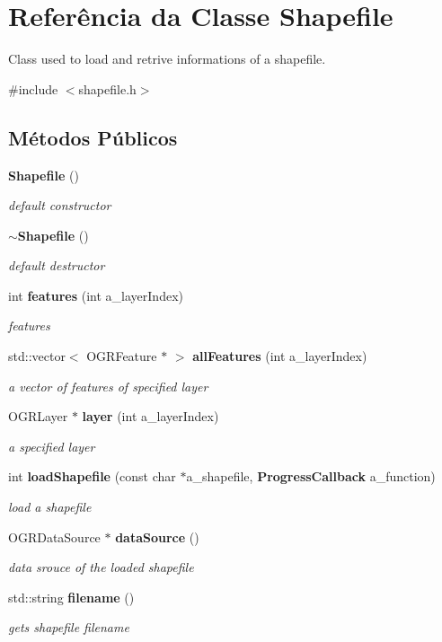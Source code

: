 \section{Referência da Classe Shapefile}
\label{class_shapefile}


Class used to load and retrive informations of a shapefile.  




{\ttfamily \#include $<$shapefile.\+h$>$}

\subsection*{Métodos Públicos}
\begin{DoxyCompactItemize}
\item 
{\bf Shapefile} ()
\begin{DoxyCompactList}\small\item\em default constructor \end{DoxyCompactList}\item 
{\bf $\sim$\+Shapefile} ()
\begin{DoxyCompactList}\small\item\em default destructor \end{DoxyCompactList}\item 
int {\bf features} (int a\+\_\+layer\+Index)
\begin{DoxyCompactList}\small\item\em features \end{DoxyCompactList}\item 
std\+::vector$<$ O\+G\+R\+Feature $\ast$ $>$ {\bf all\+Features} (int a\+\_\+layer\+Index)
\begin{DoxyCompactList}\small\item\em a vector of features of specified layer \end{DoxyCompactList}\item 
O\+G\+R\+Layer $\ast$ {\bf layer} (int a\+\_\+layer\+Index)
\begin{DoxyCompactList}\small\item\em a specified layer \end{DoxyCompactList}\item 
int {\bf load\+Shapefile} (const char $\ast$a\+\_\+shapefile, {\bf Progress\+Callback} a\+\_\+function)
\begin{DoxyCompactList}\small\item\em load a shapefile \end{DoxyCompactList}\item 
O\+G\+R\+Data\+Source $\ast$ {\bf data\+Source} ()
\begin{DoxyCompactList}\small\item\em data srouce of the loaded shapefile \end{DoxyCompactList}\item 
std\+::string {\bf filename} ()
\begin{DoxyCompactList}\small\item\em gets shapefile filename \end{DoxyCompactList}\end{DoxyCompactItemize}


